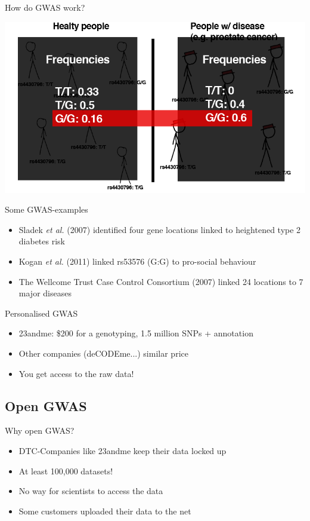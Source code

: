\documentclass[12pt,a4paper]{beamer}
\begin{document}
\begin{frame}{How do GWAS work?}
\begin{center}
\includegraphics[scale=0.4]{gwas4.png} \\
\end{center}
\end{frame}

\begin{frame}{Some GWAS-examples}
\begin{itemize}
\item Sladek \textit{et al.} (2007) identified four gene locations linked to heightened type 2 diabetes risk
\pause \item Kogan \textit{et al.} (2011) linked rs53576 (G:G) to pro-social behaviour
\pause \item The Wellcome Trust Case Control Consortium (2007) linked 24 locations to 7 major diseases 
\end{itemize}
\end{frame}

\begin{frame}{Personalised GWAS}
\begin{itemize}
\item 23andme: \$200 for a genotyping, 1.5 million SNPs + annotation
\pause \item Other companies (deCODEme...) similar price
\pause \item You get access to the raw data!
\end{itemize}
\end{frame}

\subsection{Open GWAS}
\begin{frame}{Why open GWAS?}
\begin{itemize}
\item DTC-Companies like 23andme keep their data locked up
\pause \item At least 100,000 datasets!
\pause \item No way for scientists to access the data
\pause \item Some customers uploaded their data to the net
\end{itemize}
\end{frame}
\end{document}

